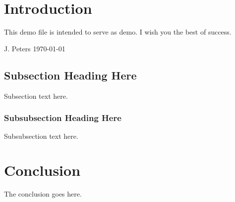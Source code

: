 \section{Introduction}\label{introduction}

This demo file is intended to serve as demo. I wish you the best of
success.

\hfill J. Peters \hfill \today

\subsection{Subsection Heading Here}\label{subsection-heading-here}

Subsection text here.

\subsubsection{Subsubsection Heading
Here}\label{subsubsection-heading-here}

Subsubsection text here.

\section{Conclusion}\label{conclusion}

The conclusion goes here.
